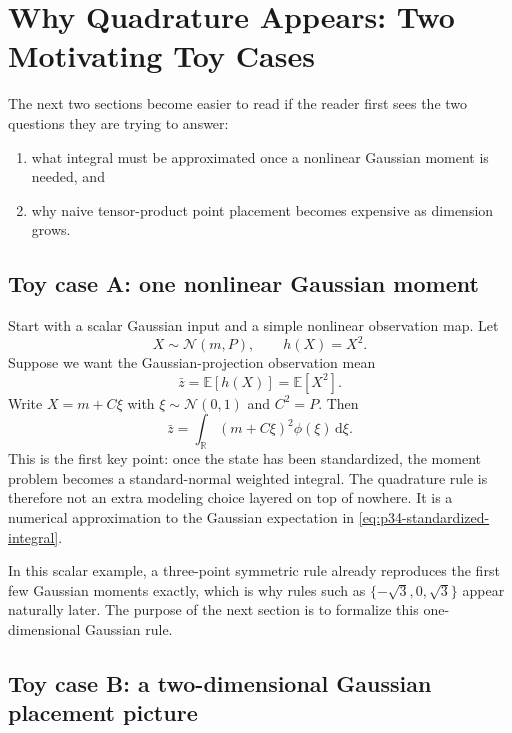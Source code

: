 \documentclass[11pt]{article}
\numberwithin{equation}{section}
\newcommand{\R}{\mathbb R}
\newcommand{\E}{\mathbb E}
\newcommand{\N}{\mathcal N}
\newcommand{\dd}{\,\mathrm d}
\begin{document}
\section{Why Quadrature Appears: Two Motivating Toy Cases}
\label{sec:p34-motivating-cases}

The next two sections become easier to read if the reader first sees the two
questions they are trying to answer:
\begin{enumerate}[leftmargin=0.28in]
  \item what integral must be approximated once a nonlinear Gaussian moment is
  needed, and
  \item why naive tensor-product point placement becomes expensive as dimension
  grows.
\end{enumerate}

\subsection{Toy case A: one nonlinear Gaussian moment}
\label{subsec:p34-scalar-motivation}

Start with a scalar Gaussian input and a simple nonlinear observation map.
Let
\begin{equation}
  X\sim\N(m,P),
  \qquad
  h(X)=X^2.
  \label{eq:p34-scalar-gaussian-model}
\end{equation}
Suppose we want the Gaussian-projection observation mean
\begin{equation}
  \bar z = \E[h(X)] = \E[X^2].
  \label{eq:p34-scalar-target-mean}
\end{equation}
Write \(X=m+C\xi\) with \(\xi\sim\N(0,1)\) and \(C^2=P\).  Then
\begin{equation}
  \bar z
  =
  \int_{\R} (m+C\xi)^2\phi(\xi)\dd\xi.
  \label{eq:p34-standardized-integral}
\end{equation}
This is the first key point: once the state has been standardized, the moment
problem becomes a standard-normal weighted integral.  The quadrature rule is
therefore not an extra modeling choice layered on top of nowhere.  It is a
numerical approximation to the Gaussian expectation in
\eqref{eq:p34-standardized-integral}.

In this scalar example, a three-point symmetric rule already reproduces the
first few Gaussian moments exactly, which is why rules such as
\(\{-\sqrt3,0,\sqrt3\}\) appear naturally later.  The purpose of the next
section is to formalize this one-dimensional Gaussian rule.

\subsection{Toy case B: a two-dimensional Gaussian placement picture}
\label{subsec:p34-2d-motivation}
\end{document}
